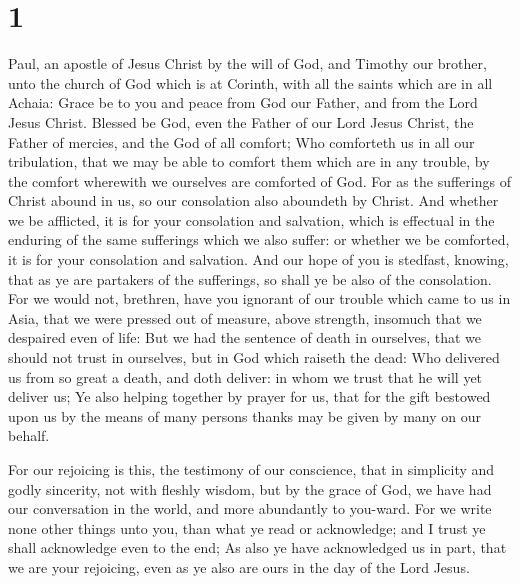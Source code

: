 \hypertarget{section}{%
\section{1}\label{section}}

 Paul, an apostle of Jesus Christ by the will of God, and
Timothy our brother, unto the church of God which is at Corinth, with
all the saints which are in all Achaia:  Grace be to you
and peace from God our Father, and from the Lord Jesus Christ.
 Blessed be God, even the Father of our Lord Jesus Christ,
the Father of mercies, and the God of all comfort;  Who
comforteth us in all our tribulation, that we may be able to comfort
them which are in any trouble, by the comfort wherewith we ourselves are
comforted of God.  For as the sufferings of Christ abound
in us, so our consolation also aboundeth by Christ.  And
whether we be afflicted, it is for your consolation and salvation, which
is effectual in the enduring of the same sufferings which we also
suffer: or whether we be comforted, it is for your consolation and
salvation.  And our hope of you is stedfast, knowing, that
as ye are partakers of the sufferings, so shall ye be also of the
consolation.  For we would not, brethren, have you
ignorant of our trouble which came to us in Asia, that we were pressed
out of measure, above strength, insomuch that we despaired even of life:
 But we had the sentence of death in ourselves, that we
should not trust in ourselves, but in God which raiseth the dead:
 Who delivered us from so great a death, and doth
deliver: in whom we trust that he will yet deliver us; 
Ye also helping together by prayer for us, that for the gift bestowed
upon us by the means of many persons thanks may be given by many on our
behalf.

 For our rejoicing is this, the testimony of our
conscience, that in simplicity and godly sincerity, not with fleshly
wisdom, but by the grace of God, we have had our conversation in the
world, and more abundantly to you-ward.  For we write
none other things unto you, than what ye read or acknowledge; and I
trust ye shall acknowledge even to the end;  As also ye
have acknowledged us in part, that we are your rejoicing, even as ye
also are ours in the day of the Lord Jesus.

